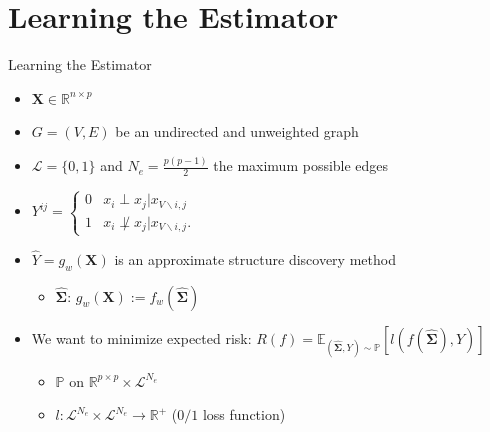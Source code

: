\documentclass{beamer}
\begin{document}
\section{Learning the Estimator}
\begin{frame}{Learning the Estimator}
  \begin{itemize}
  \item $\mathbf{X} \in \mathbb{R}^{n \times p}$
  \item $G=(V,E)$ be an undirected and unweighted graph
  \item $\mathcal{L}=\{0,1\}$ and $N_e=\frac{p(p-1)}{2}$ the maximum
    possible edges
  \item $Y^{ij} =  \begin{cases}
      0 &  x_i  \perp x_j | x_{V\backslash{i,j}} \\
      1 & x_i  \not\perp x_j | x_{V\backslash{i,j}} .
    \end{cases}$
  \item $\hat{Y}=g_{w}(\mathbf{X})$ is an approximate structure
    discovery method
    \begin{itemize}
      \item $\hat{\mathbf{\Sigma}}$: $g_{w}(\mathbf{X}) := f_{w}(\hat{\mathbf{\Sigma}})$
      \end{itemize}
    \item We want to minimize expected risk: $R ( f ) = \mathbb { E }
      _ { ( \hat { \mathbf { \Sigma } } , Y ) \sim \mathbb { P } } [ l
      ( f ( \hat { \mathbf { \Sigma } } ) , Y ) ]$
      \begin{itemize}
        \item $\mathbb { P }$ on $\mathbb { R } ^ { p \times p }
          \times \mathcal { L } ^ { N _ { e } }$
        \item $l : \mathcal { L } ^ { N _ { e } } \times \mathcal { L }
          ^ { N _ { e } } \rightarrow \mathbb { R } ^ { + }$ ($0/1$
          loss function)
      \end{itemize}
  \end{itemize}
\end{frame}
\end{document}
